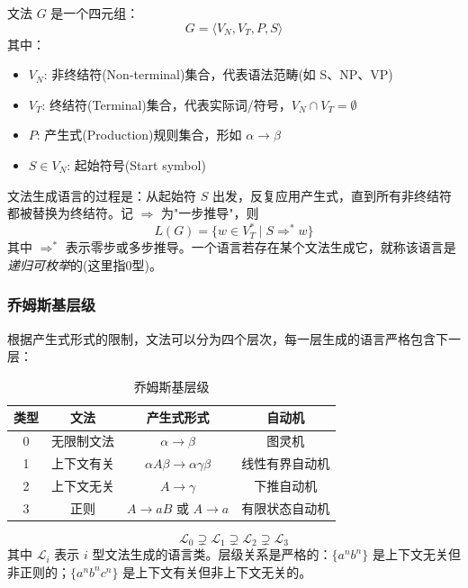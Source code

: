 \begin{definition}[短语结构文法]
文法 $G$ 是一个四元组：
\begin{equation}
    G = \langle V_N, V_T, P, S \rangle
\end{equation}
其中：
\begin{itemize}
    \item $V_N$: 非终结符(Non-terminal)集合，代表语法范畴(如 S、NP、VP)
    \item $V_T$: 终结符(Terminal)集合，代表实际词/符号，$V_N \cap V_T = \emptyset$
    \item $P$: 产生式(Production)规则集合，形如 $\alpha \rightarrow \beta$
    \item $S \in V_N$: 起始符号(Start symbol)
\end{itemize}
\end{definition}

文法生成语言的过程是：从起始符 $S$ 出发，反复应用产生式，直到所有非终结符都被替换为终结符。记 $\Rightarrow$ 为"一步推导"，则
\begin{equation}
    L(G) = \{ w \in V_T^* \mid S \Rightarrow^* w \}
\end{equation}
其中 $\Rightarrow^*$ 表示零步或多步推导。一个语言若存在某个文法生成它，就称该语言是\emph{递归可枚举}的(这里指0型)。

\subsubsection{乔姆斯基层级}

根据产生式形式的限制，文法可以分为四个层次，每一层生成的语言严格包含下一层：

\begin{table}[H]
\centering
\caption{乔姆斯基层级}
\begin{tabulary}{\textwidth}{@{}CCCC@{}}
\toprule
\textbf{类型} & \textbf{文法} & \textbf{产生式形式} & \textbf{自动机} \\
 & 无限制文法 & $\alpha \rightarrow \beta$ & 图灵机 \\
1 & 上下文有关 & $\alpha A \beta \rightarrow \alpha \gamma \beta$ & 线性有界自动机 \\
2 & 上下文无关 & $A \rightarrow \gamma$ & 下推自动机 \\
3 & 正则 & $A \rightarrow aB$ 或 $A \rightarrow a$ & 有限状态自动机 \\
\bottomrule
\end{tabulary}
\end{table}

\begin{equation}
    \mathcal{L}_0 \supsetneq \mathcal{L}_1 \supsetneq \mathcal{L}_2 \supsetneq \mathcal{L}_3
\end{equation}
其中 $\mathcal{L}_i$ 表示 $i$ 型文法生成的语言类。层级关系是严格的：$\{a^n b^n\}$ 是上下文无关但非正则的；$\{a^n b^n c^n\}$ 是上下文有关但非上下文无关的。

